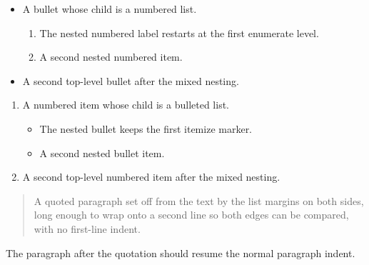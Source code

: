 \documentclass[acmsmall,nonacm]{acmart}
\begin{document}
\begin{itemize}
\item A bullet whose child is a numbered list.
  \begin{enumerate}
  \item The nested numbered label restarts at the first enumerate level.
  \item A second nested numbered item.
  \end{enumerate}
\item A second top-level bullet after the mixed nesting.
\end{itemize}

\begin{enumerate}
\item A numbered item whose child is a bulleted list.
  \begin{itemize}
  \item The nested bullet keeps the first itemize marker.
  \item A second nested bullet item.
  \end{itemize}
\item A second top-level numbered item after the mixed nesting.
\end{enumerate}

\begin{quote}
A quoted paragraph set off from the text by the list margins on both sides,
long enough to wrap onto a second line so both edges can be compared, with no
first-line indent.
\end{quote}

The paragraph after the quotation should resume the normal paragraph indent.
\end{document}
